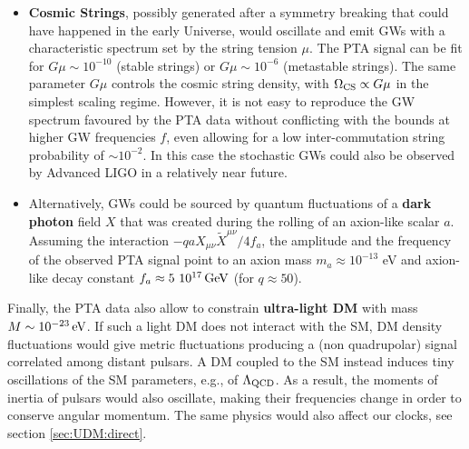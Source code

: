 \begin{itemize}
\item[$\circ$] {\bf Cosmic Strings}, possibly generated after a symmetry breaking that  could have happened in the early Universe,
would oscillate and emit GWs with a characteristic spectrum set by the string tension $\mu$.
The {\sc PTA} signal can be fit for $G\mu \sim10^{-10}$ (stable strings) or $G\mu \sim 10^{-6}$ (metastable strings).
The same parameter $G\mu$ controls the  cosmic string density, with $\Omega_{\rm CS} \propto G \mu$ in the simplest scaling regime. 
However, it is not easy to reproduce the GW spectrum favoured by the PTA data without conflicting with
the bounds at higher GW frequencies $f$, even allowing for a low  inter-commutation string probability of $\sim 10^{-2}$.
In this case the stochastic GWs could also be observed by Advanced LIGO in a relatively near future. 






\item[$\circ$] 
Alternatively,  GWs could be sourced by quantum fluctuations of a {\bf dark photon} field $X$ 
that was created during the rolling of an axion-like scalar $a$. 
Assuming the interaction $-q a X_{\mu\nu}\tilde X^{\mu\nu}/4f_a$,
the amplitude and the frequency of the observed {\sc PTA} signal point  to an axion mass $m_a\approx 10^{-13}$ eV  
and axion-like decay constant $f_a\approx 5 ~ 10^{17}\,{\rm GeV}$ (for $q\approx50$). 
\end{itemize}
Finally, the PTA data also allow to constrain {\bf ultra-light DM} with mass $M \sim 10^{-23}\,{\rm eV}$. 
If such a light DM does not interact with the SM, DM density fluctuations would give metric fluctuations 
producing a (non quadrupolar) signal correlated among distant pulsars.
A DM coupled to the SM instead induces tiny oscillations of the SM parameters,  e.g., of $ \Lambda_{\rm QCD}$.
As a result, the moments of  inertia of pulsars would also oscillate, making their frequencies change in order to conserve angular momentum. 
The same physics would also affect our clocks, see section \ref{sec:UDM:direct}. 



